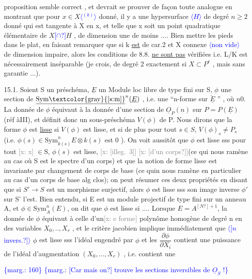 \documentclass[11pt]{article}
\newcommand{\scanpage}[1]{\par\bigskip\noindent{\small\sffamily[scan #1]}\par}
\newcommand{\mspage}[1]{{\small\sffamily[p.\,#1]}}
\newcommand{\hand}[1]{\textcolor{blue}{#1}}
\let\over\relax
\newcommand{\over}[2]{\textcolor{gray}{#1}\textcolor{blue}{\ensuremath{^{\!\nearrow}}#2}}
\newcommand{\inserted}[2][]{\textcolor{blue}{$\langle$#2$\rangle$}}
\newcommand{\margin}[1]{\textcolor{blue}{\{\textsf{marg.:} #1\}}}
\newcommand{\xout}[1]{\textcolor{gray}{[\textsf{x:} #1]}}
\newcommand{\uline}[1]{\underline{#1}}
\newcommand{\unsure}[1]{[#1?]}
\newcommand{\illegible}[1]{[\textsf{illeg.\ #1}]}
\begin{document}
proposition semble correct , et devrait se prouver de façon toute analogue
en montrant que pour $x\in X$\inserted{$^{(k)}$} donné, il y a une hypersurface \inserted{$H$} de degré $n\geqslant 2$
donné qui est tangente à X en x, et telle que x soit un point quadratique
élémentaire de $X$\hand{\unsure{$\cap$}}$H$ , de dimension une de moins .... Bien mettre les
pieds dans le plat, en faisant remarquer que si k \uline{est} de car.2 et X
connexe \inserted{non vide} de dimension impaire, alors les conditions de 8.8. \uline{ne sont pas}
vérifiées i.e. L/K est nécessairement inséparable (je crois, de degré
2 exactement si $X\subset P^r$ , mais sans garantie ...).

15.1. Soient S un préschéma, $\underline{E}$ un Module loc libre de type fini
sur S, $\phi$ une section de $\underline{\mathrm{Sym\xout{m}}}^n(\underline{E})$ , i.e. une ``n-forme sur $\check{\underline{E}}$ '' , où $n$\over{$>$}{\unsure{$\geqslant$}}$0$.
La donnée de $\phi$ équivaut à la donnée d'une section de $\underline{O}_P(n)$ sur $P=P(\underline{E})$
(réf àIII), et définit donc un sous-préschéma $V(\phi)$ de P. Nous dirons que
la forme $\phi$ est \uline{lisse} si $V(\phi)$ est lisse, et si de plus pour tout $s\in S$,
$V(\phi)_s\neq P_s$ (i.e. $\phi(s)\in \mathrm{Sym}^n_{k(s)}E\otimes k(s)$ est \over{$=$}{\unsure{$\neq$}}$0$ ). On voit aussitôt
que $\phi$ est lisse sss pour tout \xout{x} $\in$S, $\phi(s)$ est lisse, \xout{\illegible{3}}
\xout{\unsure{d'un corps}}(ce qui nous ramène au cas où S est le spectre d'un corps) et
que la notion de forme lisse est invariante par changement de corps de
base (ce quin nous ramène en particulier au cas d'un corps de base alg
clos); on peut résumer ces deux propriétés en disant que si $S'\to S$ est
un morphisme surjectif, alors $\phi$ est lisse sss son image inverse $\phi'$ sur S'
l'est. Bien entendu, si E est un module projectif de type fini sur un
anneau A, et $\phi\in\mathrm{Sym}^n_A(E)$, on dit que $\phi$ est lisse si .... Lorsque $E=A^{\unsure{N}+1}$,
la donnée de $\phi$ équivaut à celle d'un\xout{e forme} polynôme homogène de degré n
en des variables $X_0,..,X_r$ , et le critère jacobien implique immédiatement
que \inserted{\unsure{$n$ invers.}} $\phi$ est lisse sss l'idéal engendré par $\phi$ et les $\dfrac{\partial\phi}{\partial X_i}$ contient
une puissance de l'idéal d'augmentation $(X_0,\dots,X_r)$ , i.e. contient une

\margin{160} \margin{\unsure{Car mais on} trouve les sections inversibles de $\underline{O}_S$ !}

\clearpage
\scanpage{25/161}
\mspage{4}
\end{document}
